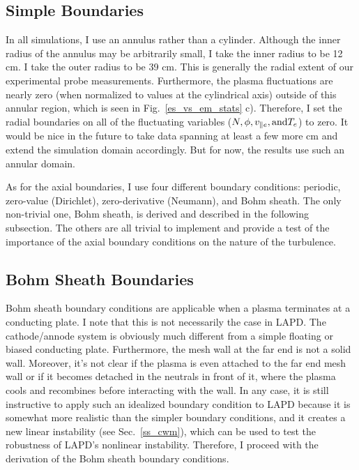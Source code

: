 \subsection{Simple Boundaries}
\label{ss_s_bc}

In all simulations, I use an annulus rather than a cylinder. Although the inner radius of the annulus may be arbitrarily small, I take the inner radius to be 12 cm. I take the outer radius
to be 39 cm. This is generally the radial extent of our experimental probe measurements. Furthermore, the plasma fluctuations are nearly zero (when normalized to values at the cylindrical axis)
outside of this annular
region, which is seen in Fig.~\ref{es_vs_em_stats} c). Therefore, I set the radial boundaries on all of the fluctuating variables ($N, \phi, v_{\parallel e}, {\rm and } T_e$) to zero. It would be nice
in the future to take data spanning at least a few more cm and extend the simulation domain accordingly. But for now, the results use such an annular domain.

As for the axial boundaries, I use four different boundary conditions: periodic, zero-value (Dirichlet), zero-derivative (Neumann), and Bohm sheath. 
The only non-trivial one, Bohm sheath, is derived and described in
the following subsection. The others are all trivial to implement and provide a test of the importance of the axial boundary conditions on the nature of the turbulence.

\subsection{Bohm Sheath Boundaries}
\label{ss_bs_bc}

Bohm sheath boundary conditions are applicable when a plasma terminates at a conducting plate. I note that this is not necessarily the case in LAPD. 
The cathode/annode system is obviously much different from a simple floating or biased conducting plate. Furthermore, the mesh wall at the far end is not a solid wall.
Moreover, it's not clear if the plasma is even attached to the far end mesh wall or if it becomes detached in the neutrals in front of it, where the plasma cools and recombines
before interacting with the wall. In any case, it is still instructive to apply such an idealized boundary condition to LAPD because it is somewhat more realistic
than the simpler boundary conditions, and it creates a new linear instability (see Sec.~\ref{ss_cwm}), which can be used to test the robustness of LAPD's nonlinear instability.
Therefore, I proceed with the derivation of the Bohm sheath boundary conditions.

